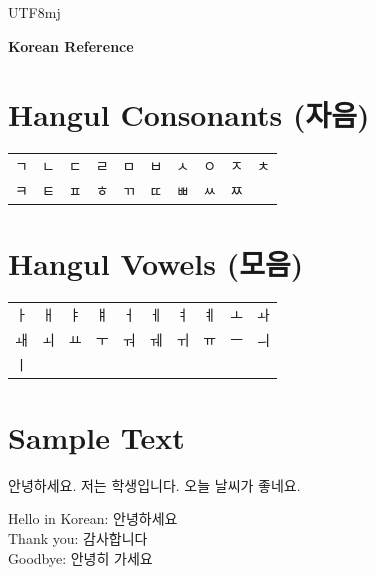 \documentclass[11pt]{article}
\begin{document}
\begin{CJK}{UTF8}{mj}

\centerline{\Large\bf Korean Reference}\par
\bigskip

\section{Hangul Consonants (자음)}

\begin{tabular}{llllllllll}
ㄱ & ㄴ & ㄷ & ㄹ & ㅁ & ㅂ & ㅅ & ㅇ & ㅈ & ㅊ \\
ㅋ & ㅌ & ㅍ & ㅎ & ㄲ & ㄸ & ㅃ & ㅆ & ㅉ & \\
\end{tabular}

\section{Hangul Vowels (모음)}

\begin{tabular}{llllllllll}
ㅏ & ㅐ & ㅑ & ㅒ & ㅓ & ㅔ & ㅕ & ㅖ & ㅗ & ㅘ \\
ㅙ & ㅚ & ㅛ & ㅜ & ㅝ & ㅞ & ㅟ & ㅠ & ㅡ & ㅢ \\
ㅣ & & & & & & & & & \\
\end{tabular}

\section{Sample Text}

안녕하세요. 저는 학생입니다. 오늘 날씨가 좋네요.

Hello in Korean: 안녕하세요 \\
Thank you: 감사합니다 \\
Goodbye: 안녕히 가세요

\end{CJK}
\end{document}
